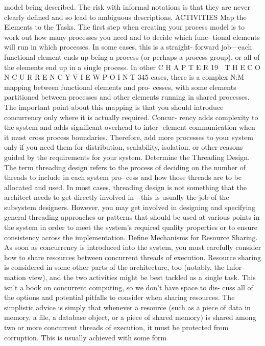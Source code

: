 model being described. The risk with informal notations is that they are
never clearly defined and so lead to ambiguous descriptions.
ACTIVITIES
Map the Elements to the Tasks. The first step when creating your process
model is to work out how many processes you need and to decide which func-
tional elements will run in which processes. In some cases, this is a straight-
forward job—each functional element ends up being a process (or perhaps a
process group), or all of the elements end up in a single process. In other
C H A P T E R 19  T H E C O N C U R R E N C Y V I E W P O I N T
 345
cases, there is a complex N:M mapping between functional elements and pro-
cesses, with some elements partitioned between processes and other elements
running in shared processes. The important point about this mapping is that
you should introduce concurrency only where it is actually required. Concur-
rency adds complexity to the system and adds significant overhead to inter-
element communication when it must cross process boundaries. Therefore,
add more processes to your system only if you need them for distribution,
scalability, isolation, or other reasons guided by the requirements for your
system.
Determine the Threading Design. The term threading design refers to the
process of deciding on the number of threads to include in each system pro-
cess and how those threads are to be allocated and used. In most cases,
threading design is not something that the architect needs to get directly
involved in—this is usually the job of the subsystem designers. However, you
may get involved in designing and specifying general threading approaches or
patterns that should be used at various points in the system in order to meet
the system’s required quality properties or to ensure consistency across the
implementation.
Define Mechanisms for Resource Sharing. As soon as concurrency is
introduced into the system, you must carefully consider how to share
resources between concurrent threads of execution. Resource sharing is
considered in some other parts of the architecture, too (notably, the Infor-
mation view), and the two activities might be best tackled as a single task.
This isn’t a book on concurrent computing, so we don’t have space to dis-
cuss all of the options and potential pitfalls to consider when sharing
resources. The simplistic advice is simply that whenever a resource (such as
a piece of data in memory, a file, a database object, or a piece of shared
memory) is shared among two or more concurrent threads of execution, it
must be protected from corruption. This is usually achieved with some form
